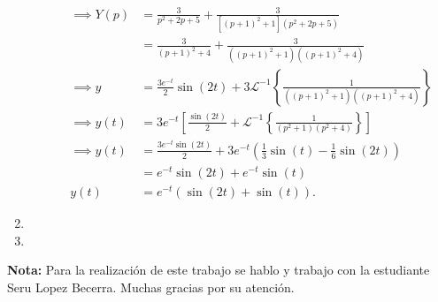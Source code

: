\documentclass[12pt]{exam}
\newcommand{\Laplace}{\mathscr{L}}
\begin{document}
\begin{enumerate}
\begin{enumerate}
\begin{align*}
		\implies Y\left( p \right) &= \frac{3}{p^2 + 2p + 5} + \frac{3}{\left[ \left( p + 1 \right)^2 + 1 \right] \left( p^2 + 2p + 5 \right) } \\
		&= \frac{3}{\left( p + 1 \right)^2 + 4} + \frac{3}{\left( \left( p + 1 \right)^2 + 1 \right) \left( \left( p + 1 \right)^2 + 4 \right) } \\
		\implies y &= \frac{3e^{-t}}{2}\sin\left( 2t \right) + 3\Laplace^{-1}\left\{ \frac{1}{\left( \left( p + 1 \right)^2 + 1 \right) \left( \left( p + 1 \right)^2 + 4 \right) } \right\} \\
		\implies y\left( t \right) &= 3e^{-t}\left[ \frac{\sin\left( 2t \right) }{2} + \Laplace^{-1}\left\{ \frac{1}{\left( p^2 + 1 \right) \left( p^2 + 4 \right) } \right\} \right] \\
		\implies y\left( t \right) &= \frac{3e^{-t}\sin\left( 2t \right) }{2} + 3e^{-t}\left( \frac{1}{3}\sin\left( t \right) - \frac{1}{6}\sin\left( 2t \right)  \right)  \\
		&= e^{-t}\sin\left( 2t \right) + e^{-t}\sin\left( t \right) \\
		y\left( t \right) &= e^{-t}\left( \sin\left( 2t \right) + \sin\left( t \right)  \right) 
	      .\end{align*}
	  \end{enumerate}
	\item 
	\item 
\end{enumerate}

\textbf{Nota:} Para la realización de este trabajo se hablo y trabajo con la estudiante Seru Lopez Becerra. Muchas gracias por su atención.
\end{document}

